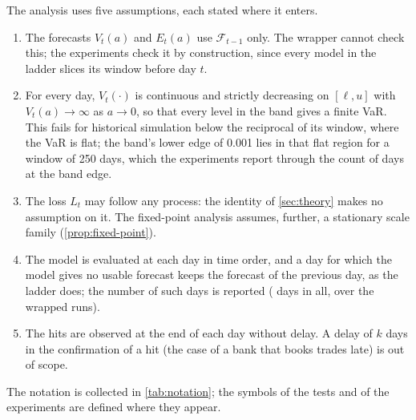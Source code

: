 The analysis uses five assumptions, each stated where it enters.
\begin{enumerate}
\item The forecasts $V_t(a)$ and $E_t(a)$ use $\mathcal{F}_{t-1}$ only. The wrapper cannot check this; the experiments check it by construction, since every model in the ladder slices its window before day $t$.
\item For every day, $V_t(\cdot)$ is continuous and strictly decreasing on $[\ell, u]$ with $V_t(a) \to \infty$ as $a \to 0$, so that every level in the band gives a finite VaR. This fails for historical simulation below the reciprocal of its window, where the VaR is flat; the band's lower edge of 0.001 lies in that flat region for a window of 250 days, which the experiments report through the count of days at the band edge.
\item The loss $L_t$ may follow any process: the identity of \cref{sec:theory} makes no assumption on it. The fixed-point analysis assumes, further, a stationary scale family (\cref{prop:fixed-point}).
\item The model is evaluated at each day in time order, and a day for which the model gives no usable forecast keeps the forecast of the previous day, as the ladder does; the number of such days is reported (\tenFallback{} days in all, over the \tenIndRunsAll{} wrapped runs).
\item The hits are observed at the end of each day without delay. A delay of $k$ days in the confirmation of a hit (the case of a bank that books trades late) is out of scope.
\end{enumerate}
The notation is collected in \cref{tab:notation}; the symbols of the tests and of the experiments are defined where they appear.


